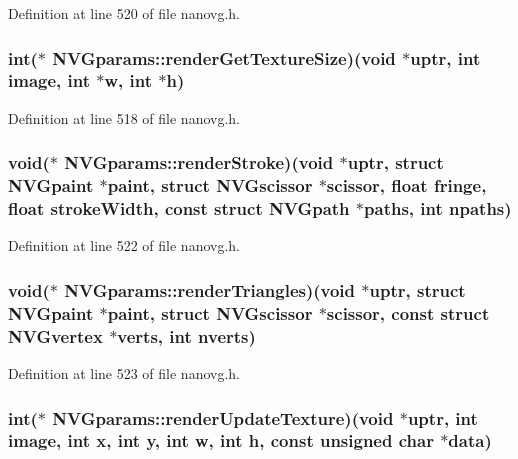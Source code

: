 Definition at line 520 of file nanovg.\+h.

\hypertarget{struct_n_v_gparams_a2ecbd50cea119eb702cfbab7538596b8}{
\subsubsection[{render\+Get\+Texture\+Size}]{\setlength{\rightskip}{0pt plus 5cm}int($\ast$ N\+V\+Gparams\+::render\+Get\+Texture\+Size)(void $\ast$uptr, int image, int $\ast$w, int $\ast$h)}}\label{struct_n_v_gparams_a2ecbd50cea119eb702cfbab7538596b8}


Definition at line 518 of file nanovg.\+h.

\hypertarget{struct_n_v_gparams_a9b56486a8c43791466312e5b886539e0}{
\subsubsection[{render\+Stroke}]{\setlength{\rightskip}{0pt plus 5cm}void($\ast$ N\+V\+Gparams\+::render\+Stroke)(void $\ast$uptr, struct {\bf N\+V\+Gpaint} $\ast$paint, struct {\bf N\+V\+Gscissor} $\ast$scissor, float fringe, float stroke\+Width, const struct {\bf N\+V\+Gpath} $\ast$paths, int npaths)}}\label{struct_n_v_gparams_a9b56486a8c43791466312e5b886539e0}


Definition at line 522 of file nanovg.\+h.

\hypertarget{struct_n_v_gparams_ac8410294c4712cda7b1754f123a9c4d5}{
\subsubsection[{render\+Triangles}]{\setlength{\rightskip}{0pt plus 5cm}void($\ast$ N\+V\+Gparams\+::render\+Triangles)(void $\ast$uptr, struct {\bf N\+V\+Gpaint} $\ast$paint, struct {\bf N\+V\+Gscissor} $\ast$scissor, const struct {\bf N\+V\+Gvertex} $\ast$verts, int nverts)}}\label{struct_n_v_gparams_ac8410294c4712cda7b1754f123a9c4d5}


Definition at line 523 of file nanovg.\+h.

\hypertarget{struct_n_v_gparams_ab9ece91b2fa9528d2fde0a134086f3a5}{
\subsubsection[{render\+Update\+Texture}]{\setlength{\rightskip}{0pt plus 5cm}int($\ast$ N\+V\+Gparams\+::render\+Update\+Texture)(void $\ast$uptr, int image, int x, int y, int w, int h, const unsigned char $\ast$data)}}\label{struct_n_v_gparams_ab9ece91b2fa9528d2fde0a134086f3a5}


